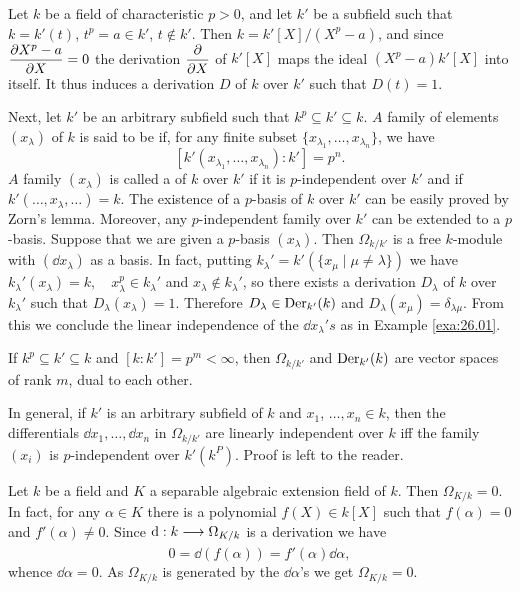 \documentclass[../main]{subfiles}
\begin{document}
\begin{parexample}\label{exa:26.02}
Let $k$ be a field of characteristic $p>0$, and let $k'$ be a subfield such that $k=k'(t)$, $t^p=a \in k'$, $t \not\in k'$. Then $k=k'[X] /(X^p-a)$, and since $\dfrac{\partial X^p-a}{\partial X}= 0$ the derivation $\dfrac{\partial }{\partial X}$ of $k'[X]$ maps the ideal $(X^p-a) k'[X]$ into itself. It thus induces a derivation $D$ of $k$ over $k'$ such that $D(t)=1$.

Next, let $k'$ be an arbitrary subfield such that $k^p \subseteq k'\subseteq k$. $A$ family of elements $(x_\lambda)$ of $k$ is said to be  if, for any finite subset $\{x_{\lambda_1}, \dots, x_{\lambda_n}\}$, we have \[[k'(x_{\lambda_1}, \dots, x_{\lambda_n}): k']=p^n.\] $A$ family $(x_\lambda)$ is called a  of $k$ over $k'$ if it is $p$-independent over $k'$ and if $k'(\dots, x_\lambda, \dots)=k$. The existence of a $p$-basis of $k$ over $k'$ can be easily proved by Zorn's lemma. Moreover, any $p$-independent family over $k'$ can be extended to a $p$-basis. Suppose that we are given a $p$-basis $(x_\lambda)$. Then $\Omega_{k / k'}$ is a free $k$-module with $(\dd x_\lambda)$ as a basis. In fact, putting $k_\lambda'=k'(\{x_{\mu} \mid \mu \neq \lambda\})$ we have $k_\lambda'(x_\lambda)=k,\quad x_\lambda^p \in k_\lambda'$ and $x_\lambda \notin k_\lambda'$, so there exists a derivation $D_\lambda$ of $k$ over $k_\lambda'$ such that $D_\lambda(x_\lambda)=1$. Therefore $D_\lambda \in \operatorname{Der}_{k'}(k)$ and $D_\lambda(x_{\mu})=\delta_{\lambda \mu}$. From this we conclude the linear independence of the $\dd x_\lambda' s$ as in Example \ref{exa:26.01}.

If $k^p \subseteq k' \subseteq k$ and $[k: k']=p^m<\infty$, then $\Omega_{k / k'}$ and $\operatorname{Der}_{k'}(k)$ are vector spaces of rank $m$, dual to each other.

In general, if $k'$ is an arbitrary subfield of $k$ and $x_1$, $\dots, x_n \in k$, then the differentials $\dd x_1, \dots, \dd x_n$ in $\Omega_{k / k'}$ are linearly independent over $k$ iff the family $(x_i)$ is $p$-independent over $k'(k^P)$. Proof is left to the reader.
\end{parexample}

\begin{parexample}
    Let $k$ be a field and $K$ a separable algebraic extension field of $k$. Then $\Omega_{K/k}=0$. In fact, for any $\alpha \in K$ there is a polynomial $f(X) \in k[X]$ such that $f(\alpha)=0$ and $f'(\alpha) \neq 0$. Since $\dd: k \varrightarrow{} \Omega_{K / k}$ is a derivation we have \[0=\dd(f(\alpha))=f'(\alpha) \dd \alpha,\] whence $\dd \alpha=0$. As $\Omega_{K / k}$ is generated by the $\dd \alpha$'s we get $\Omega_{K / k}=0$.
\end{parexample} 
\end{document}
